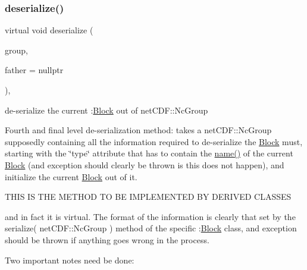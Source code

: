 \subsubsection{\texorpdfstring{deserialize()}{deserialize()}\hspace{0.1cm}{\footnotesize\ttfamily [3/3]}}
{\footnotesize\ttfamily virtual void deserialize (\begin{DoxyParamCaption}\item[{net\+C\+D\+F\+::\+Nc\+Group \&\&}]{group,  }\item[{\mbox{\hyperlink{class_s_m_spp__di__unipi__it_1_1_block}{Block}} $\ast$}]{father = {\ttfamily nullptr} }\end{DoxyParamCaption})\hspace{0.3cm}{\ttfamily [inline]}, {\ttfamily [virtual]}}



de-\/serialize the current \+:\mbox{\hyperlink{class_s_m_spp__di__unipi__it_1_1_block}{Block}} out of net\+C\+D\+F\+::\+Nc\+Group 

Fourth and final level de-\/serialization method\+: takes a net\+C\+D\+F\+::\+Nc\+Group supposedly containing all the information required to de-\/serialize the \mbox{\hyperlink{class_s_m_spp__di__unipi__it_1_1_block}{Block}} must, starting with the \char`\"{}type\char`\"{} attribute that has to contain the \mbox{\hyperlink{class_s_m_spp__di__unipi__it_1_1_block_a738e9dfd6e00507da219e4bd5a3f6be9}{name()}} of the current \mbox{\hyperlink{class_s_m_spp__di__unipi__it_1_1_block}{Block}} (and exception should clearly be thrown is this does not happen), and initialize the current \mbox{\hyperlink{class_s_m_spp__di__unipi__it_1_1_block}{Block}} out of it. \begin{DoxyVerb} THIS IS THE METHOD TO BE IMPLEMENTED BY DERIVED CLASSES
\end{DoxyVerb}


and in fact it is virtual. The format of the information is clearly that set by the serialize( net\+C\+D\+F\+::\+Nc\+Group ) method of the specific \+:\mbox{\hyperlink{class_s_m_spp__di__unipi__it_1_1_block}{Block}} class, and exception should be thrown if anything goes wrong in the process.

Two important notes need be done\+:



